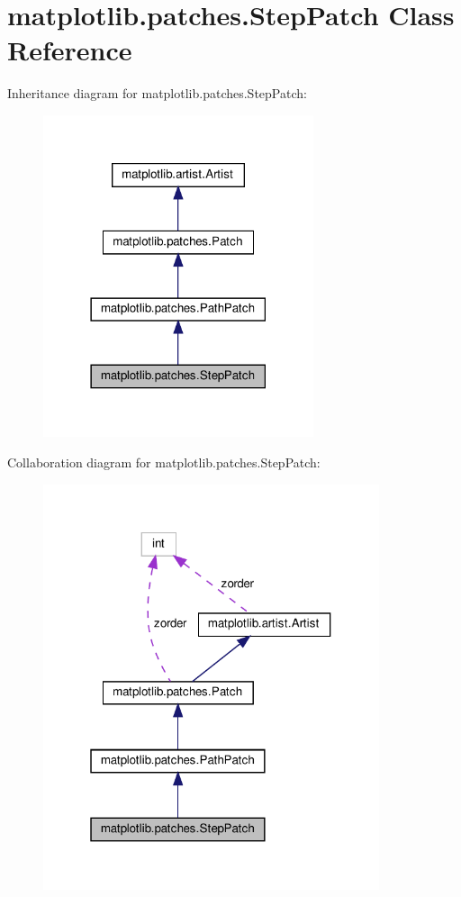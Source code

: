 \hypertarget{classmatplotlib_1_1patches_1_1StepPatch}{}\section{matplotlib.\+patches.\+Step\+Patch Class Reference}
\label{classmatplotlib_1_1patches_1_1StepPatch}


Inheritance diagram for matplotlib.\+patches.\+Step\+Patch\+:
\nopagebreak
\begin{figure}[H]
\begin{center}
\leavevmode
\includegraphics[width=225pt]{classmatplotlib_1_1patches_1_1StepPatch__inherit__graph}
\end{center}
\end{figure}


Collaboration diagram for matplotlib.\+patches.\+Step\+Patch\+:
\nopagebreak
\begin{figure}[H]
\begin{center}
\leavevmode
\includegraphics[width=280pt]{classmatplotlib_1_1patches_1_1StepPatch__coll__graph}
\end{center}
\end{figure}
